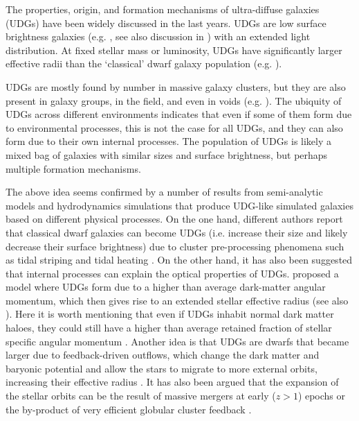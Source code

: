 \documentclass[fleqn,usenatbib]{mnras}
\begin{document}
The properties, origin, and formation mechanisms of ultra-diffuse galaxies (UDGs) have been widely discussed in the last years. UDGs \citep{vandokkum2015} are low surface brightness galaxies (e.g. \citealt{impey1988}, see also discussion in \citealt{conselice2018}) with an extended light distribution. At fixed stellar mass or luminosity, UDGs have significantly larger effective radii than the `classical' dwarf galaxy population (e.g. \citealt{vandokkum2015,mihos2015, udgs_kiwics,chamba_udgs}).

UDGs are mostly found by number in massive galaxy clusters, but they are also present in galaxy groups, in the field, and even in voids (e.g. \citealt{vanderburg2016,leisman2017, roman_outsideclusters,udgs_kiwics,roman_udginvoid,barbosa_udgs2020,karunakaran2020}). The ubiquity of UDGs across different environments indicates that even if some of them form due to environmental processes, this is not the case for all UDGs, and they can also form due to their own internal processes. The population of UDGs is likely a mixed bag of galaxies with similar sizes and surface brightness, but perhaps multiple formation mechanisms.

The above idea seems confirmed by a number of results from semi-analytic models and hydrodynamics simulations that produce UDG-like simulated galaxies based on different physical processes. On the one hand, different authors report that classical dwarf galaxies can become UDGs (i.e. increase their size and likely decrease their surface brightness) due to cluster pre-processing phenomena such as tidal striping and tidal heating \citep{carleton_udgs,tremmel_udgs,sales_udgs}. On the other hand, it has also been suggested that internal processes can explain the optical properties of UDGs. \citet{amorisco2016} proposed a model where UDGs form due to a higher than average dark-matter angular momentum, which then gives rise to an extended stellar effective radius (see also \citealt{rong_udgs}). Here it is worth mentioning that even if UDGs inhabit normal dark matter haloes, they could still have a higher than average retained fraction of stellar specific angular momentum \citep{posti_spin,huds2020}. Another idea is that UDGs are dwarfs that became larger due to feedback-driven outflows, which change the dark matter and baryonic potential and allow the stars to migrate to more external orbits, increasing their effective radius \citep{nihao_udgs,fire_udgs}. It has also been argued that the expansion of the stellar orbits can be the result of massive mergers at early ($z > 1$) epochs  \citep{wright_udgs} or the by-product of very efficient globular cluster feedback \citep{trujillogomez_udgs}.
\end{document}
